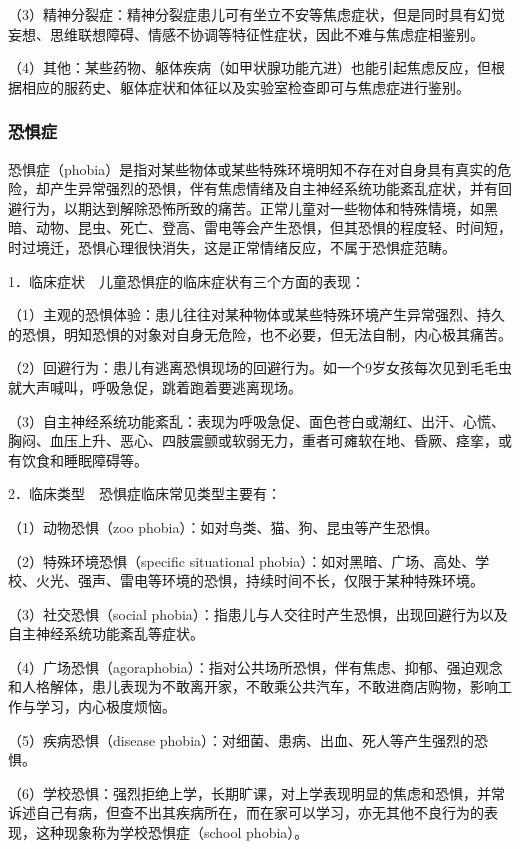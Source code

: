 （3）精神分裂症：精神分裂症患儿可有坐立不安等焦虑症状，但是同时具有幻觉妄想、思维联想障碍、情感不协调等特征性症状，因此不难与焦虑症相鉴别。

（4）其他：某些药物、躯体疾病（如甲状腺功能亢进）也能引起焦虑反应，但根据相应的服药史、躯体症状和体征以及实验室检查即可与焦虑症进行鉴别。

\subsubsection{恐惧症}

恐惧症（phobia）是指对某些物体或某些特殊环境明知不存在对自身具有真实的危险，却产生异常强烈的恐惧，伴有焦虑情绪及自主神经系统功能紊乱症状，并有回避行为，以期达到解除恐怖所致的痛苦。正常儿童对一些物体和特殊情境，如黑暗、动物、昆虫、死亡、登高、雷电等会产生恐惧，但其恐惧的程度轻、时间短，时过境迁，恐惧心理很快消失，这是正常情绪反应，不属于恐惧症范畴。

1．临床症状　儿童恐惧症的临床症状有三个方面的表现：

（1）主观的恐惧体验：患儿往往对某种物体或某些特殊环境产生异常强烈、持久的恐惧，明知恐惧的对象对自身无危险，也不必要，但无法自制，内心极其痛苦。

（2）回避行为：患儿有逃离恐惧现场的回避行为。如一个9岁女孩每次见到毛毛虫就大声喊叫，呼吸急促，跳着跑着要逃离现场。

（3）自主神经系统功能紊乱：表现为呼吸急促、面色苍白或潮红、出汗、心慌、胸闷、血压上升、恶心、四肢震颤或软弱无力，重者可瘫软在地、昏厥、痉挛，或有饮食和睡眠障碍等。

2．临床类型　恐惧症临床常见类型主要有：

（1）动物恐惧（zoo phobia）：如对鸟类、猫、狗、昆虫等产生恐惧。

（2）特殊环境恐惧（specific situational
phobia）：如对黑暗、广场、高处、学校、火光、强声、雷电等环境的恐惧，持续时间不长，仅限于某种特殊环境。

（3）社交恐惧（social
phobia）：指患儿与人交往时产生恐惧，出现回避行为以及自主神经系统功能紊乱等症状。

（4）广场恐惧（agoraphobia）：指对公共场所恐惧，伴有焦虑、抑郁、强迫观念和人格解体，患儿表现为不敢离开家，不敢乘公共汽车，不敢进商店购物，影响工作与学习，内心极度烦恼。

（5）疾病恐惧（disease
phobia）：对细菌、患病、出血、死人等产生强烈的恐惧。

（6）学校恐惧：强烈拒绝上学，长期旷课，对上学表现明显的焦虑和恐惧，并常诉述自己有病，但查不出其疾病所在，而在家可以学习，亦无其他不良行为的表现，这种现象称为学校恐惧症（school
phobia）。

